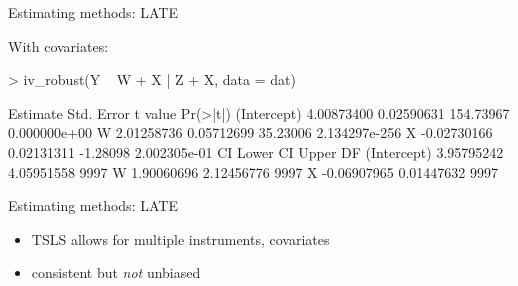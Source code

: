 \documentclass[xcolor={dvipsnames},handout]{beamer}
\begin{document}
\begin{frame}[fragile]{Estimating methods: LATE}

With covariates:

\scriptsize
\begin{Schunk}
\begin{Sinput}
> iv_robust(Y ~ W + X | Z + X, data = dat)
\end{Sinput}
\begin{Soutput}
               Estimate Std. Error   t value      Pr(>|t|)
(Intercept)  4.00873400 0.02590631 154.73967  0.000000e+00
W            2.01258736 0.05712699  35.23006 2.134297e-256
X           -0.02730166 0.02131311  -1.28098  2.002305e-01
               CI Lower   CI Upper   DF
(Intercept)  3.95795242 4.05951558 9997
W            1.90060696 2.12456776 9997
X           -0.06907965 0.01447632 9997
\end{Soutput}
\end{Schunk}


\end{frame}



\begin{frame}{Estimating methods: LATE}

\begin{itemize}
\item TSLS allows for multiple instruments, covariates
\item consistent but \textit{not} unbiased
\end{itemize}

\end{frame}


\end{document}
